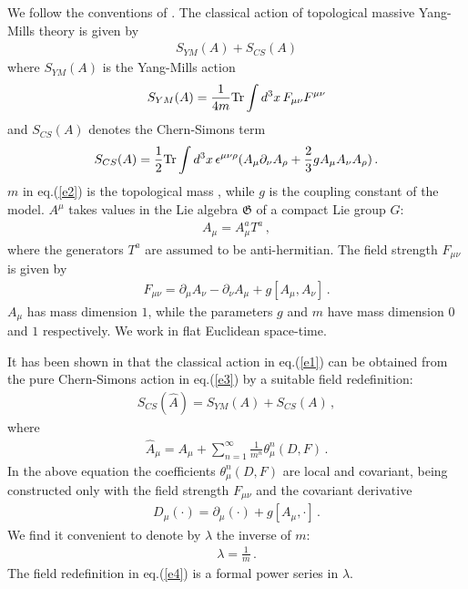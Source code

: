 \documentclass[a4paper,11pt]{article}
\begin{document}
We follow the conventions of \cite{sorella2}. The classical action of topological massive
Yang-Mills theory is given by
%
\begin{eqnarray}
S_{YM}(A) + S_{CS}(A)
\label{e1}
\end{eqnarray}
%
where $S_{YM}(A)$ is the Yang-Mills action 
%
\begin{eqnarray}
S_{YM}(A) = \frac{1}{4m} {\rm Tr} \int d^3x \, F_{\mu\nu}F^{\mu\nu} 
\label{e2}
\end{eqnarray}
%
and $S_{CS}(A)$ denotes the Chern-Simons term
%
\begin{eqnarray}
S_{CS} (A) = \frac{1}{2} {\rm Tr} \int d^3x \, \epsilon^{\mu\nu\rho} (A_\mu \partial_\nu A_\rho
+ \frac{2}{3} g A_\mu A_\nu A_\rho ) \, .
\label{e3}
\end{eqnarray}
%
$m$ in eq.(\ref{e2}) is the topological mass \cite{top_mass}, while
$g$ is the coupling constant of the model.
$A^\mu$ takes values in the Lie algebra $\mathfrak{G}$ of a compact
Lie group $G$:
%
\begin{eqnarray}
A_\mu = A_\mu^a T^a \, ,
\label{e3_1}
\end{eqnarray}
%
where the generators $T^a$ are assumed to be anti-hermitian.
The field strength $F_{\mu\nu}$ is given by
%
\begin{eqnarray}
F_{\mu\nu} = \partial_\mu A_\nu - \partial_\nu A_\mu + g [A_\mu,A_\nu] \, .
\label{e3_1_1}
\end{eqnarray}
%
$A_\mu$ has mass dimension $1$, while the parameters $g$ and $m$
have mass dimension $0$ and $1$ respectively.
We work in flat Euclidean space-time.
%

It has been shown in \cite{sorella1, sorella2} that 
the classical action in eq.(\ref{e1}) can be obtained from the
pure Chern-Simons action in eq.(\ref{e3}) by a suitable field
redefinition:
%
\begin{eqnarray}
S_{CS}(\hat A) = S_{YM}(A) + S_{CS}(A) \, ,
\label{e6}
\end{eqnarray}
%
where
%
\begin{eqnarray}
\hat A_\mu = A_\mu + \sum_{n=1}^\infty \frac{1}{m^n} \theta^n_\mu(D,F) \, .
\label{e4}
\end{eqnarray}
%
In the above equation the coefficients $\theta^n_\mu(D,F)$ are local and covariant,
being constructed only with the field strength $F_{\mu\nu}$ and
the covariant derivative
%
\begin{eqnarray}
D_\mu (\cdot) = \partial_\mu(\cdot) + g[A_\mu,\cdot] \, .
\label{e5}
\end{eqnarray}
%
We find it convenient to denote by $\lambda$ the inverse of $m$:
%
\begin{eqnarray}
\lambda = \frac{1}{m} \, .
\label{e7}
\end{eqnarray}
%
The field redefinition in eq.(\ref{e4}) is a formal power series
in $\lambda$. 
\end{document}
